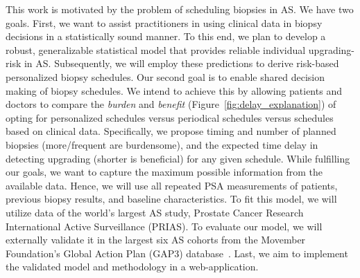 This work is motivated by the problem of scheduling biopsies in AS. We have two goals. First, we want to assist practitioners in using clinical data in biopsy decisions in a statistically sound manner. To this end, we plan to develop a robust, generalizable statistical model that provides reliable individual upgrading-risk in AS. Subsequently, we will employ these predictions to derive risk-based personalized biopsy schedules. Our second goal is to enable shared decision making of biopsy schedules. We intend to achieve this by allowing patients and doctors to compare the \emph{burden} and \emph{benefit} (Figure~\ref{fig:delay_explanation}) of opting for personalized schedules versus periodical schedules versus schedules based on clinical data. Specifically, we propose timing and number of planned biopsies (more/frequent are burdensome), and the expected time delay in detecting upgrading (shorter is beneficial) for any given schedule. While fulfilling our goals, we want to capture the maximum possible information from the available data. Hence, we will use all repeated PSA measurements of patients, previous biopsy results, and baseline characteristics. To fit this model, we will utilize data of the world's largest AS study, Prostate Cancer Research International Active Surveillance (PRIAS). To evaluate our model, we will externally validate it in the largest six AS cohorts from the Movember Foundation's Global Action Plan (GAP3) database~\citep{gap3_2018}. Last, we aim to implement the validated model and methodology in a web-application.